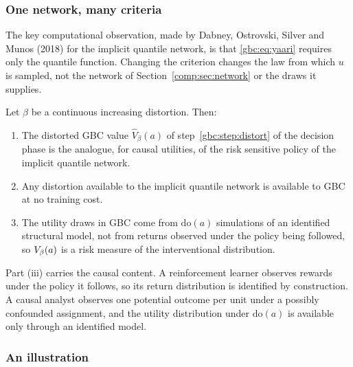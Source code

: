 \subsubsection{One network, many criteria}

The key computational observation, made by Dabney, Ostrovski, Silver and Munos (2018) for the implicit quantile network, is that \eqref{gbc:eq:yaari} requires only the quantile function. Changing the criterion changes the law from which $u$ is sampled, not the network of Section~\ref{comp:sec:network} or the draws it supplies.

\begin{remark}\label{gbc:prop:iqn}
Let $\beta$ be a continuous increasing distortion. Then:
\begin{enumerate}[label=(\roman*)]
\item The distorted GBC value $\hat V_\beta(a)$ of step~\ref{gbc:step:distort} of the decision phase is the analogue, for causal utilities, of the risk sensitive policy of the implicit quantile network.
\item Any distortion available to the implicit quantile network is available to GBC at no training cost.
\item The utility draws in GBC come from $\mathrm{do}(a)$ simulations of an identified structural model, not from returns observed under the policy being followed, so $V_{\beta}(a)$ is a risk measure of the interventional distribution.
\end{enumerate}
\end{remark}

Part (iii) carries the causal content. A reinforcement learner observes rewards under the policy it follows, so its return distribution is identified by construction. A causal analyst observes one potential outcome per unit under a possibly confounded assignment, and the utility distribution under $\mathrm{do}(a)$ is available only through an identified model.

\subsubsection{An illustration}

